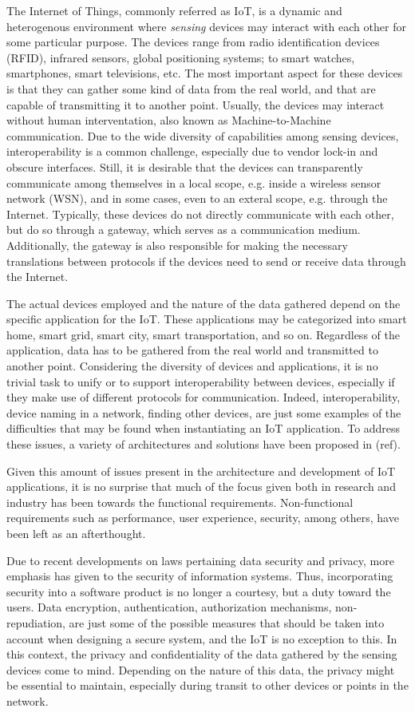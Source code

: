 \documentclass[12pt]{article}
\newcommand{\TODO}{\todo[inline]}
\begin{document}
The Internet of Things, commonly referred as IoT, is a dynamic and heterogenous environment where \emph{sensing} devices may interact with each other for some particular purpose. The devices range from radio identification devices (RFID), infrared sensors, global positioning systems; to smart watches, smartphones, smart televisions, etc. The most important aspect for these devices is that they can gather some kind of data from the real world, and that are capable of transmitting it to another point. Usually, the devices may interact without human interventation, also known as Machine-to-Machine communication. Due to the wide diversity of capabilities among sensing devices, interoperability is a common challenge, especially due to vendor lock-in and obscure interfaces. Still, it is desirable that the devices can transparently communicate among themselves in a local scope, e.g. inside a wireless sensor network (WSN), and in some cases, even to an exteral scope, e.g. through the Internet. Typically, these devices do not directly communicate with each other, but do so through a gateway, which serves as a communication medium. Additionally, the gateway is also responsible for making the necessary translations between protocols if the devices need to send or receive data through the Internet.

The actual devices employed and the nature of the data gathered depend on the specific application for the IoT. These applications may be categorized into smart home, smart grid, smart city, smart transportation, and so on. Regardless of the application, data has to be gathered from the real world and transmitted to another point. Considering the diversity of devices and applications, it is no trivial task to unify or to support interoperability between devices, especially if they make use of different protocols for communication. Indeed, interoperability, device naming in a network, finding other devices, are just some examples of the difficulties that may be found when instantiating an IoT application. To address these issues, a variety of architectures and solutions have been proposed in (ref). 

Given this amount of issues present in the architecture and development of IoT applications, it is no surprise that much of the focus given both in research and industry has been towards the functional requirements. Non-functional requirements such as performance, user experience, security, among others, have been left as an afterthought.

\TODO{look for reference on law about privacy}
Due to recent developments on laws pertaining data security and privacy, more emphasis has given to the security of information systems. Thus, incorporating security into a software product is no longer a courtesy, but a duty toward the users. Data encryption, authentication, authorization mechanisms, non-repudiation, are just some of the possible measures that should be taken into account when designing a secure system, and the IoT is no exception to this. In this context, the privacy and confidentiality of the data gathered by the sensing devices come to mind. Depending on the nature of this data, the privacy might be essential to maintain, especially during transit to other devices or points in the network.
\end{document}
